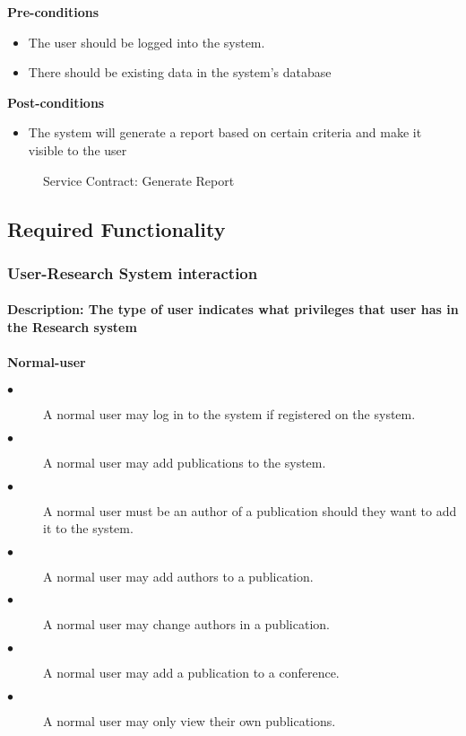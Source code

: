 \documentclass[a4paper]{article}
\begin{document}
    	\textbf{Pre-conditions}
    	 \begin{itemize}
    		\item The user should be logged into the system.
    		\item There should be existing data in the system's database
     	\end{itemize}
    	
    	\textbf{Post-conditions}
    	 \begin{itemize}
    		\item The system will generate a report based on certain criteria and make it visible to the user
    	\end{itemize}
    		    	\begin{figure}[H]
    		    		\centering
    		    		\caption{Service Contract: Generate Report}
    		    	\end{figure}
    	
        \pagebreak	
    \subsection{Required Functionality}
    \subsubsection{User-Research System interaction}
	\paragraph{\textbf{Description:} The type of user indicates what privileges that user has in the Research system}
	\paragraph{\textbf{Normal-user}}
	\begin{description}
		\item[$\bullet$] A normal user may log in to the system if registered on the system.
		\item[$\bullet$] A normal user may add publications to the system.
		\item[$\bullet$] A normal user must be an author of a publication should they want to add it to the system.
		\item[$\bullet$] A normal user may add authors to a publication.
		\item[$\bullet$] A normal user may change authors in a publication.
		\item[$\bullet$] A normal user may add a publication to a conference.
		\item[$\bullet$] A normal user may only view their own publications.
	\end{description}
\end{document}
